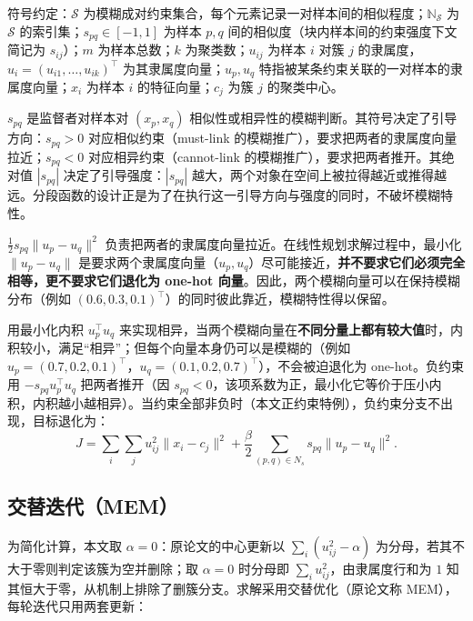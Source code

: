 \documentclass[11pt,a4paper]{ctexart}
\begin{document}
	符号约定：$\mathcal{S}$ 为模糊成对约束集合，每个元素记录一对样本间的相似程度；$\mathbb{N}_{\mathcal{S}}$ 为 $\mathcal{S}$ 的索引集；$s_{pq}\in[-1,1]$ 为样本 $p,q$ 间的相似度（块内样本间的约束强度下文简记为 $s_{ij}$）；$m$ 为样本总数；$k$ 为聚类数；$u_{ij}$ 为样本 $i$ 对簇 $j$ 的隶属度，$u_i = (u_{i1}, \ldots, u_{ik})^{\top}$ 为其隶属度向量；$u_p, u_q$ 特指被某条约束关联的一对样本的隶属度向量；$x_i$ 为样本 $i$ 的特征向量；$c_j$ 为簇 $j$ 的聚类中心。
	
	\(s_{pq}\) 是监督者对样本对 \((x_p, x_q)\) 相似性或相异性的模糊判断。其符号决定了引导方向：\(s_{pq}>0\) 对应相似约束（must-link 的模糊推广），要求把两者的隶属度向量拉近；\(s_{pq}<0\) 对应相异约束（cannot-link 的模糊推广），要求把两者推开。其绝对值 \(|s_{pq}|\) 决定了引导强度：\(|s_{pq}|\) 越大，两个对象在空间上被拉得越近或推得越远。分段函数的设计正是为了在执行这一引导方向与强度的同时，不破坏模糊特性。
	
	\(\frac{1}{2}s_{pq}\|u_p-u_q\|^{2}\) 负责把两者的隶属度向量拉近。在线性规划求解过程中，最小化 \(\|u_p-u_q\|\) 是要求两个隶属度向量（\(u_p, u_q\)）尽可能接近，\textbf{并不要求它们必须完全相等，更不要求它们退化为 one-hot 向量}。因此，两个模糊向量可以在保持模糊分布（例如 \((0.6,0.3,0.1)^\top\)）的同时彼此靠近，模糊特性得以保留。
	
	用最小化内积 \(u_p^\top u_q\) 来实现相异，当两个模糊向量在\textbf{不同分量上都有较大值}时，内积较小，满足“相异”；但每个向量本身仍可以是模糊的（例如 \(u_p=(0.7,0.2,0.1)^\top\)，\(u_q=(0.1,0.2,0.7)^\top\)），不会被迫退化为 one-hot。负约束用 \(-s_{pq}u_p^{\top}u_q\) 把两者推开（因 \(s_{pq}<0\)，该项系数为正，最小化它等价于压小内积，内积越小越相异）。当约束全部非负时（本文正约束特例），负约束分支不出现，目标退化为：
	\begin{equation}
		J = \sum_i \sum_j u_{ij}^{2}\|x_i - c_j\|^{2}
		+ \frac{\beta}{2}\sum_{(p,q)\in N_s} s_{pq}\|u_p - u_q\|^{2}.
	\end{equation}
	
	
	\subsection{交替迭代（MEM）}
	
	
	为简化计算，本文取 $\alpha = 0$：原论文的中心更新以 $\sum_i (u_{ij}^{2} - \alpha)$ 为分母，若其不大于零则判定该簇为空并删除；取 $\alpha = 0$ 时分母即 $\sum_i u_{ij}^{2}$，由隶属度行和为 $1$ 知其恒大于零，从机制上排除了删簇分支。求解采用交替优化（原论文称 MEM），每轮迭代只用两套更新：
	
\end{document}
